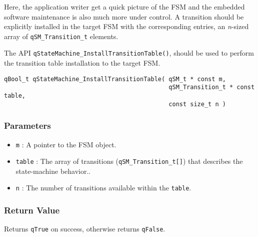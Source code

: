 Here, the application writer get a quick picture of the FSM and the embedded software maintenance is also much more under control. A transition should be explicitly installed in the target FSM with the corresponding entries, an \textit{n}-sized array of \lstinline{qSM_Transition_t} elements. 

The API \lstinline{qStateMachine_InstallTransitionTable()}, should be used to perform the transition table installation to the target FSM.
\medskip

\begin{lstlisting}[style=CStyle]
qBool_t qStateMachine_InstallTransitionTable( qSM_t * const m, 
                                              qSM_Transition_t * const table,
                                              const size_t n )
\end{lstlisting} 

\subsubsection*{Parameters}
\begin{itemize}
    \item \lstinline{m} : A pointer to the FSM object. 
    \item \lstinline{table} : The array of transitions (\lstinline{qSM_Transition_t[]}) that describes the state-machine behavior.. 
    \item \lstinline{n} : The number of transitions available within the \lstinline{table}.
\end{itemize}

\subsubsection*{Return Value}
Returns \lstinline{qTrue} on success, otherwise returns \lstinline{qFalse}.

\hrulefill

